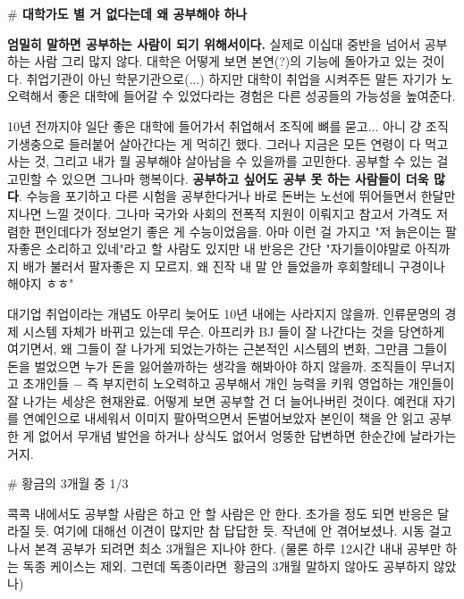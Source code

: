 \textbf{$\#$ 대학가도 별 거 없다는데 왜 공부해야 하나}
\vspace{5mm}

\textbf{엄밀히 말하면 공부하는 사람이 되기 위해서이다.}
실제로 이십대 중반을 넘어서 공부하는 사람 그리 많지 않다.
대학은 어떻게 보면 본연(?)의 기능에 돌아가고 있는 것이다. 취업기관이 아닌 학문기관으로(...)
하지만 대학이 취업을 시켜주든 말든 자기가 노오력해서 좋은 대학에 들어갈 수 있었다라는 경험은 다른 성공들의 가능성을 높여준다.
\vspace{5mm}

10년 전까지야 일단 좋은 대학에 들어가서 취업해서 조직에 뼈를 묻고... 아니 걍 조직 기생충으로 들러붙어 살아간다는 게 먹히긴 했다.
그러나 지금은 모든 연령이 다 먹고사는 것, 그리고 내가 뭘 공부해야 살아남을 수 있을까를 고민한다.
공부할 수 있는 걸 고민할 수 있으면 그나마 행복이다. \textbf{공부하고 싶어도 공부 못 하는 사람들이 더욱 많다}.
수능을 포기하고 다른 시험을 공부한다거나 바로 돈버는 노선에 뛰어들면서 한달만 지나면 느낄 것이다.
그나마 국가와 사회의 전폭적 지원이 이뤄지고 참고서 가격도 저렴한 편인데다가 정보얻기 좋은 게 수능이었음을.
아마 이런 걸 가지고 "저 늙은이는 팔자좋은 소리하고 있네"라고 할 사람도 있지만 내 반응은 간단
"자기들이야말로 아직까지 배가 불러서 팔자좋은 지 모르지. 왜 진작 내 말 안 들었을까 후회할테니 구경이나 해야지 ㅎㅎ"
\vspace{5mm}

대기업 취업이라는 개념도 아무리 늦어도 10년 내에는 사라지지 않을까. 인류문명의 경제 시스템 자체가 바뀌고 있는데 무슨.
아프리카 BJ 들이 잘 나간다는 것을 당연하게 여기면서, 왜 그들이 잘 나가게 되었는가하는 근본적인 시스템의 변화,
그만큼 그들이 돈을 벌었으면 누가 돈을 잃어쓸까하는 생각을 해봐아야 하지 않을까.
조직들이 무너지고 초개인들 $-$ 즉 부지런히 노오력하고 공부해서 개인 능력을 키워 영업하는 개인들이 잘 나가는 세상은 현재완료.
어떻게 보면 공부할 건 더 늘어나버린 것이다.
예컨대 자기를 연예인으로 내세워서 이미지 팔아먹으면서 돈벌어보았자
본인이 책을 안 읽고 공부한 게 없어서 무개념 발언을 하거나 상식도 없어서 엉뚱한 답변하면 한순간에 날라가는 거지.
\vspace{5mm}

$\#$ 황금의 3개월 중 1/3
\vspace{5mm}

콕콕 내에서도 공부할 사람은 하고 안 할 사람은 안 한다.
초가을 정도 되면 반응은 달라질 듯.
여기에 대해선 이견이 많지만 참 답답한 듯. 작년에 안 겪어보셨나.
시동 걸고나서 본격 공부가 되려면 최소 3개월은 지나야 한다.
(물론 하루 12시간 내내 공부만 하는 독종 케이스는 제외. 그런데 독종이라면 황금의 3개월 말하지 않아도 공부하지 않았나)
\vspace{5mm}

